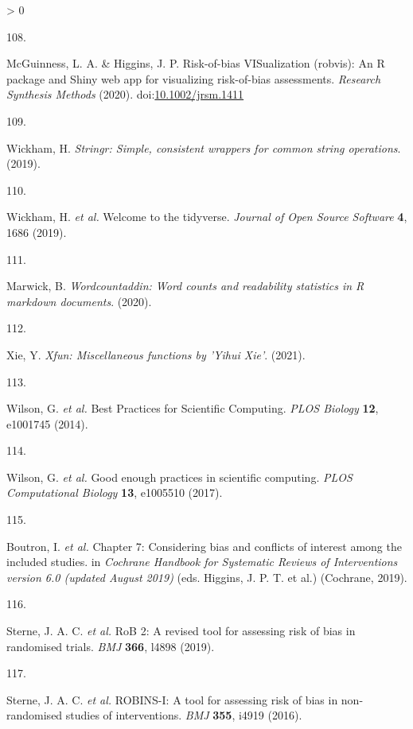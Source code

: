\documentclass[a4paper, twoside]{templates/ociamthesis}
\newlength{\cslhangindent}
\newlength{\csllabelwidth}
\newenvironment{CSLReferences}[3] %
 {%
  \setlength{\parindent}{0pt}
  \ifodd #1 \everypar{\setlength{\hangindent}{\cslhangindent}}\ignorespaces\fi
  \ifnum #2 > 0
  \setlength{\parskip}{#2\baselineskip}
  \fi
 }%
 {}
\newcommand{\CSLLeftMargin}[1]{\parbox[t]{\maxof{\widthof{#1}}{\csllabelwidth}}{#1}}
\newcommand{\CSLRightInline}[1]{\parbox[t]{\linewidth - \csllabelwidth}{#1}}
\begin{document}
\begin{CSLReferences}{0}{0}
\leavevmode\hypertarget{ref-robvis}{}%
\CSLLeftMargin{108. }
\CSLRightInline{McGuinness, L. A. \& Higgins, J. P. Risk-of-bias {VISualization} (robvis): {An R} package and {Shiny} web app for visualizing risk-of-bias assessments. \emph{Research Synthesis Methods} (2020). doi:\href{https://doi.org/10.1002/jrsm.1411}{10.1002/jrsm.1411}}

\leavevmode\hypertarget{ref-stringr}{}%
\CSLLeftMargin{109. }
\CSLRightInline{Wickham, H. \emph{Stringr: {Simple}, consistent wrappers for common string operations}. (2019).}

\leavevmode\hypertarget{ref-tidyverse}{}%
\CSLLeftMargin{110. }
\CSLRightInline{Wickham, H. \emph{et al.} Welcome to the {tidyverse}. \emph{Journal of Open Source Software} \textbf{4}, 1686 (2019).}

\leavevmode\hypertarget{ref-wordcountaddin}{}%
\CSLLeftMargin{111. }
\CSLRightInline{Marwick, B. \emph{Wordcountaddin: {Word} counts and readability statistics in {R} markdown documents}. (2020).}

\leavevmode\hypertarget{ref-xfun}{}%
\CSLLeftMargin{112. }
\CSLRightInline{Xie, Y. \emph{Xfun: {Miscellaneous} functions by '{Yihui Xie}'}. (2021).}

\leavevmode\hypertarget{ref-wilson2014}{}%
\CSLLeftMargin{113. }
\CSLRightInline{Wilson, G. \emph{et al.} Best {Practices} for {Scientific Computing}. \emph{PLOS Biology} \textbf{12}, e1001745 (2014).}

\leavevmode\hypertarget{ref-wilson2017}{}%
\CSLLeftMargin{114. }
\CSLRightInline{Wilson, G. \emph{et al.} Good enough practices in scientific computing. \emph{PLOS Computational Biology} \textbf{13}, e1005510 (2017).}

\leavevmode\hypertarget{ref-cochranechpt7}{}%
\CSLLeftMargin{115. }
\CSLRightInline{Boutron, I. \emph{et al.} Chapter 7: {Considering} bias and conflicts of interest among the included studies. in \emph{Cochrane {Handbook} for {Systematic Reviews} of {Interventions} version 6.0 (updated {August} 2019)} (eds. Higgins, J. P. T. et al.) ({Cochrane}, 2019).}

\leavevmode\hypertarget{ref-sterne2019rob}{}%
\CSLLeftMargin{116. }
\CSLRightInline{Sterne, J. A. C. \emph{et al.} {RoB} 2: A revised tool for assessing risk of bias in randomised trials. \emph{BMJ} \textbf{366}, l4898 (2019).}

\leavevmode\hypertarget{ref-sterne2016robins}{}%
\CSLLeftMargin{117. }
\CSLRightInline{Sterne, J. A. C. \emph{et al.} {ROBINS}-{I}: A tool for assessing risk of bias in non-randomised studies of interventions. \emph{BMJ} \textbf{355}, i4919 (2016).}


\end{CSLReferences}
\end{document}
